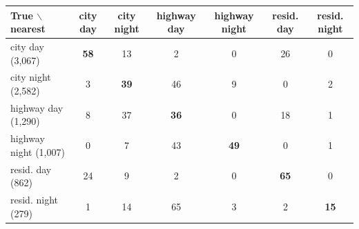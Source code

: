 \begin{tabular}{lcccccc}
\toprule
True $\backslash$ nearest & city day & city night & highway day & highway night & resid. day & resid. night \\
\midrule
city day (3,067) & \textbf{58} & 13 & 2 & 0 & 26 & 0 \\
city night (2,582) & 3 & \textbf{39} & 46 & 9 & 0 & 2 \\
highway day (1,290) & 8 & 37 & \textbf{36} & 0 & 18 & 1 \\
highway night (1,007) & 0 & 7 & 43 & \textbf{49} & 0 & 1 \\
resid. day (862) & 24 & 9 & 2 & 0 & \textbf{65} & 0 \\
resid. night (279) & 1 & 14 & 65 & 3 & 2 & \textbf{15} \\
\bottomrule
\end{tabular}
